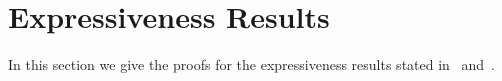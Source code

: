 \section{Expressiveness Results}

In this section we give the proofs for the expressiveness
results stated in~ and~.

%
%
%				
%
%
%


